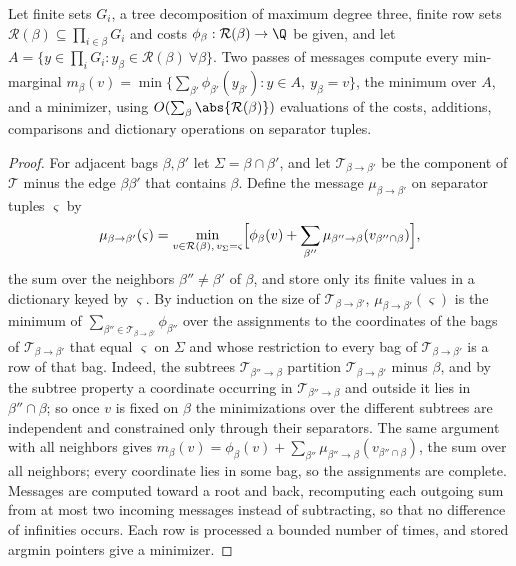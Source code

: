 \begin{lemma}\label{lem:sp:dp}
Let finite sets $G_i$, a tree decomposition of maximum degree three, finite
row sets $\mathcal R(\beta)\subseteq\prod_{i\in\beta}G_i$ and costs
$\phi_\beta:\mathcal R(\beta)\to\Q$ be given, and let
$A=\{y\in\prod_iG_i:y_\beta\in\mathcal R(\beta)\ \forall\beta\}$. Two passes
of messages compute every min-marginal
$m_\beta(v)=\min\{\sum_{\beta'}\phi_{\beta'}(y_{\beta'}):y\in A,\ y_\beta=v\}$,
the minimum over $A$, and a minimizer, using $O(\sum_\beta\abs{\mathcal R(\beta)})$
evaluations of the costs, additions, comparisons and dictionary operations
on separator tuples.
\end{lemma}

\begin{proof}
For adjacent bags $\beta,\beta'$ let $\Sigma=\beta\cap\beta'$, and let
$\mathcal T_{\beta\to\beta'}$ be the component of $\mathcal T$ minus the edge
$\beta\beta'$ that contains $\beta$. Define the message
$\mu_{\beta\to\beta'}$ on separator tuples $\varsigma$ by
\[
 \mu_{\beta\to\beta'}(\varsigma)=\min_{v\in\mathcal R(\beta),\,v_\Sigma=\varsigma}
 \Bigl[\phi_\beta(v)+\sum_{\beta''}\mu_{\beta''\to\beta}(v_{\beta''\cap\beta})\Bigr],
\]
the sum over the neighbors $\beta''\ne\beta'$ of $\beta$, and store only its
finite values in a dictionary keyed by $\varsigma$. By induction on the size
of $\mathcal T_{\beta\to\beta'}$, $\mu_{\beta\to\beta'}(\varsigma)$ is the
minimum of $\sum_{\beta''\in\mathcal T_{\beta\to\beta'}}\phi_{\beta''}$ over
the assignments to the coordinates of the bags of
$\mathcal T_{\beta\to\beta'}$ that equal $\varsigma$ on $\Sigma$ and whose
restriction to every bag of $\mathcal T_{\beta\to\beta'}$ is a row of that
bag. Indeed, the subtrees $\mathcal T_{\beta''\to\beta}$ partition
$\mathcal T_{\beta\to\beta'}$ minus $\beta$, and by the subtree property a
coordinate occurring in $\mathcal T_{\beta''\to\beta}$ and outside it lies in
$\beta''\cap\beta$; so once $v$ is fixed on $\beta$ the minimizations over
the different subtrees are independent and constrained only through their
separators. The same argument with all neighbors gives
$m_\beta(v)=\phi_\beta(v)+\sum_{\beta''}\mu_{\beta''\to\beta}(v_{\beta''\cap\beta})$,
the sum over all neighbors; every coordinate lies in some bag, so the
assignments are complete. Messages are computed toward a root and back,
recomputing each outgoing sum from at most two incoming messages instead of
subtracting, so that no difference of infinities occurs. Each row is
processed a bounded number of times, and stored argmin pointers give a
minimizer.
\end{proof}

